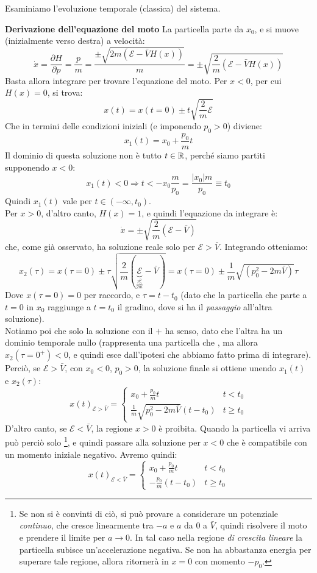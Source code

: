 \documentclass[../../FisicaTeorica.tex]{subfiles}
\begin{document}
Esaminiamo l'evoluzione temporale (classica) del sistema.\\ \begin{expl} \textbf{Derivazione dell'equazione del moto}
La particella parte da $x_0$, e si muove (inizialmente verso destra) a velocità:
\[
\dot{x}=\frac{\partial H}{\partial p}=\frac{p}{m} = \frac{\pm \sqrt{2m(\mathcal{E}-\bar{V}H(x))}}{m}=\pm \sqrt{\frac{2}{m}(\mathcal{E}-\bar{V}H(x))}
\]
Basta allora integrare per trovare l'equazione del moto. Per $x<0$, per cui $H(x)=0$, si trova:
\[
x(t)=x(t=0)\pm t\sqrt{\frac{2}{m}\mathcal{E}}
\]
Che in termini delle condizioni iniziali (e imponendo $p_0 > 0$) diviene:
\[
x_1(t)=x_0 + \frac{p_0}{m}t
\]
Il dominio di questa soluzione non è tutto $t\in \mathbb{R}$, perché siamo partiti supponendo $x<0$:
\[
x_1(t)<0\Rightarrow t < -x_0 \frac{m}{p_0} = \frac{|x_0| m}{p_0} \equiv t_0
\]
Quindi $x_1(t)$ vale per $t\in (-\infty, t_0)$.\\
Per $x>0$, d'altro canto, $H(x)=1$, e quindi l'equazione da integrare è:
\[
\dot{x}=\pm \sqrt{\frac{2}{m}(\mathcal{E}-\bar{V})}
\]
che, come già osservato, ha soluzione reale solo per $\mathcal{E}>\bar{V}$. Integrando otteniamo:
\[
x_2(\tau)=x(\tau =0)\pm \tau\sqrt{\frac{2}{m}(\underbrace{\mathcal{E}}_{\frac{p_0^2}{2m}}-\bar{V})}=x(\tau=0)\pm
\frac{1}{m}\sqrt{(p_0^2 - 2m\bar{V})}\tau
\]
Dove $x(\tau=0)=0$ per raccordo, e $\tau = t-t_0$ (dato che la particella che parte a $t=0$ in $x_0$ raggiunge a $t=t_0$ il gradino, dove si ha il \textit{passaggio} all'altra soluzione).\\
Notiamo poi che solo la soluzione con il $+$ ha senso, dato che l'altra ha un dominio temporale nullo (rappresenta una particella che , ma allora $x_2(\tau=0^+)<0$, e quindi esce dall'ipotesi che abbiamo fatto prima di integrare).\\
Perciò, se $\mathcal{E}>\bar{V}$, con $x_0 < 0$, $p_0>0$, la soluzione finale si ottiene unendo $x_1(t)$ e $x_2(\tau)$:
\[
x(t)_{\mathcal{E}>\bar{V}}=\begin{cases}
x_0 + \frac{p_0}{m}t & t<t_0\\
\frac{1}{m}\sqrt{p_0^2-2m\bar{V}}(t-t_0) & t\geq t_0
\end{cases}
\]
D'altro canto, se $\mathcal{E}<\bar{V}$, la regione $x>0$ è proibita. Quando la particella vi arriva può perciò solo \footnote{Se non si è convinti di ciò, si può provare a considerare un potenziale \textit{continuo}, che cresce linearmente tra $-a$ e $a$ da $0$ a $\bar{V}$, quindi risolvere il moto e prendere il limite per $a\to0$. In tal caso nella regione \textit{di crescita lineare} la particella subisce un'accelerazione negativa. Se non ha abbastanza energia per superare tale regione, allora ritornerà in $x=0$ con momento $-p_0$.}, e quindi passare alla soluzione per $x<0$ che è compatibile con un momento iniziale negativo. Avremo quindi:
\[
x(t)_{\mathcal{E}<\bar{V}}=\begin{cases}
x_0 + \frac{p_0}{m}t & t<t_0\\
-\frac{p_0}{m}(t-t_0) & t\geq t_0
\end{cases}
\]
\end{expl}
\end{document}
